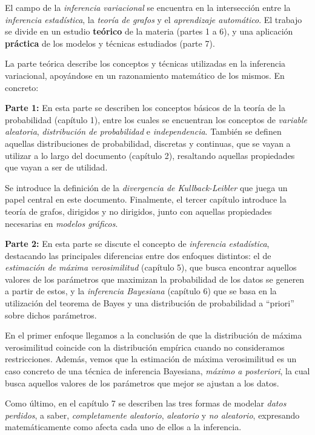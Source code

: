 
El campo de la \emph{inferencia variacional} se encuentra en la intersección entre la \emph{inferencia estadística}, la \emph{teoría de grafos} y el \emph{aprendizaje automático}. El trabajo se divide en un estudio \textbf{teórico} de la materia (partes 1 a 6), y una aplicación \textbf{práctica} de los modelos y técnicas estudiados (parte 7).

La parte teórica describe los conceptos y técnicas utilizadas en la inferencia variacional, apoyándose en un razonamiento matemático de los mismos. En concreto:

\textbf{Parte 1:} En esta parte se describen los conceptos básicos de la teoría de la probabilidad (capítulo 1), entre los cuales se encuentran los conceptos de \emph{variable aleatoria}, \emph{distribución de probabilidad} e \emph{independencia}. También se definen aquellas distribuciones de probabilidad, discretas y continuas, que se vayan a utilizar a lo largo del documento (capítulo 2), resaltando aquellas propiedades que vayan a ser de utilidad.

Se introduce la definición de la \emph{divergencia de Kullback-Leibler} que juega un papel central en este documento. Finalmente, el tercer capítulo introduce la teoría de grafos, dirigidos y no dirigidos, junto con aquellas propiedades necesarias en \emph{modelos gráficos}.

\textbf{Parte 2:} En esta parte se discute el concepto de \emph{inferencia estadística}, destacando las principales diferencias entre dos enfoques distintos: el de \emph{estimación de máxima verosimilitud} (capítulo 5), que busca encontrar aquellos valores de los parámetros que maximizan la probabilidad de los datos se generen a partir de estos, y la \emph{inferencia Bayesiana} (capítulo 6) que se basa en la utilización del teorema de Bayes y una distribución de probabilidad a ``priori'' sobre dichos parámetros.

En el primer enfoque llegamos a la conclusión de que la distribución de máxima verosimilitud coincide con la distribución empírica cuando no consideramos restricciones. Además, vemos que la estimación de máxima verosimilitud es un caso concreto de una técnica de inferencia Bayesiana, \emph{máximo a posteriori}, la cual busca aquellos valores de los parámetros que mejor se ajustan a los datos.

Como último, en el capítulo 7 se describen las tres formas de modelar \emph{datos perdidos}, a saber, \emph{completamente aleatorio}, \emph{aleatorio} y \emph{no aleatorio}, expresando matemáticamente como afecta cada uno de ellos a la inferencia.

